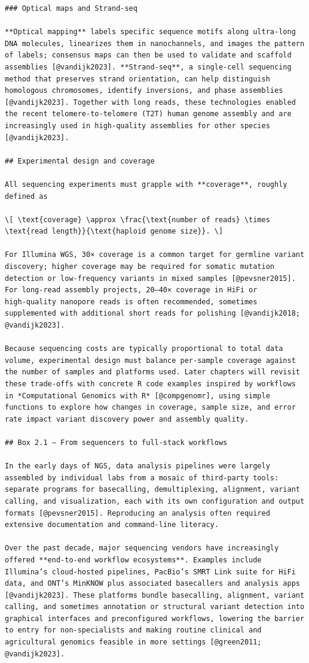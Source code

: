 \documentclass[
  letterpaper,
  DIV=11,
  numbers=noendperiod]{scrreprt}
\begin{document}
\begin{verbatim}
### Optical maps and Strand‑seq

**Optical mapping** labels specific sequence motifs along ultra‑long DNA molecules, linearizes them in nanochannels, and images the pattern of labels; consensus maps can then be used to validate and scaffold assemblies [@vandijk2023]. **Strand‑seq**, a single‑cell sequencing method that preserves strand orientation, can help distinguish homologous chromosomes, identify inversions, and phase assemblies [@vandijk2023]. Together with long reads, these technologies enabled the recent telomere‑to‑telomere (T2T) human genome assembly and are increasingly used in high‑quality assemblies for other species [@vandijk2023].

## Experimental design and coverage

All sequencing experiments must grapple with **coverage**, roughly defined as

\[ \text{coverage} \approx \frac{\text{number of reads} \times \text{read length}}{\text{haploid genome size}}. \]

For Illumina WGS, 30× coverage is a common target for germline variant discovery; higher coverage may be required for somatic mutation detection or low‑frequency variants in mixed samples [@pevsner2015]. For long‑read assembly projects, 20–40× coverage in HiFi or high‑quality nanopore reads is often recommended, sometimes supplemented with additional short reads for polishing [@vandijk2018; @vandijk2023].

Because sequencing costs are typically proportional to total data volume, experimental design must balance per‑sample coverage against the number of samples and platforms used. Later chapters will revisit these trade‑offs with concrete R code examples inspired by workflows in *Computational Genomics with R* [@compgenomr], using simple functions to explore how changes in coverage, sample size, and error rate impact variant discovery power and assembly quality.

## Box 2.1 – From sequencers to full‑stack workflows

In the early days of NGS, data analysis pipelines were largely assembled by individual labs from a mosaic of third‑party tools: separate programs for basecalling, demultiplexing, alignment, variant calling, and visualization, each with its own configuration and output formats [@pevsner2015]. Reproducing an analysis often required extensive documentation and command‑line literacy.

Over the past decade, major sequencing vendors have increasingly offered **end‑to‑end workflow ecosystems**. Examples include Illumina’s cloud‑hosted pipelines, PacBio’s SMRT Link suite for HiFi data, and ONT’s MinKNOW plus associated basecallers and analysis apps [@vandijk2023]. These platforms bundle basecalling, alignment, variant calling, and sometimes annotation or structural variant detection into graphical interfaces and preconfigured workflows, lowering the barrier to entry for non‑specialists and making routine clinical and agricultural genomics feasible in more settings [@green2011; @vandijk2023].


\end{verbatim}
\end{document}

